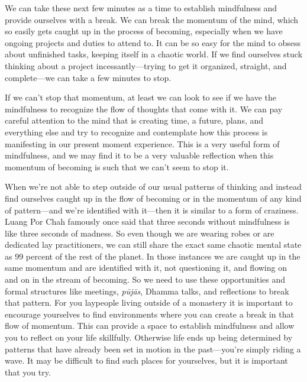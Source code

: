 
We can take these next few minutes as a time to establish mindfulness 
and provide ourselves with a break. We can break the momentum of the 
mind, which so easily gets caught up in the process of becoming, 
especially when we have ongoing projects and duties to attend to. It 
can be so easy for the mind to obsess about unfinished tasks, keeping 
itself in a chaotic world. If we find ourselves stuck thinking about a 
project incessantly---trying to get it organized, straight, and 
complete---we can take a few minutes to stop.

If we can't stop that momentum, at least we can look to see if we have 
the mindfulness to recognize the flow of thoughts that come with it. We 
can pay careful attention to the mind that is creating time, a future, 
plans, and everything else and try to recognize and contemplate how 
this process is manifesting in our present moment experience. This is a 
very useful form of mindfulness, and we may find it to be a very 
valuable reflection when this momentum of becoming is such that we 
can't seem to stop it.

When we're not able to step outside of our usual patterns of thinking 
and instead find ourselves caught up in the flow of becoming or in the 
momentum of any kind of pattern---and we're identified with it---then 
it is similar to a form of craziness. Luang Por Chah famously once said 
that three seconds without mindfulness is like three seconds of 
madness. So even though we are wearing robes or are dedicated lay 
practitioners, we can still share the exact same chaotic mental state 
as 99 percent of the rest of the planet. In those instances we are 
caught up in the same momentum and are identified with it, not 
questioning it, and flowing on and on in the stream of becoming. So we 
need to use these opportunities and formal structures like meetings, 
\emph{pūjās}, Dhamma talks, and reflections to break that pattern. 
For you laypeople living outside of a monastery it is important to 
encourage yourselves to find environments where you can create a break 
in that flow of momentum. This can provide a space to establish 
mindfulness and allow you to reflect on your life skillfully. Otherwise 
life ends up being determined by patterns that have already been set in 
motion in the past---you're simply riding a wave. It may be difficult 
to find such places for yourselves, but it is important that you try.

